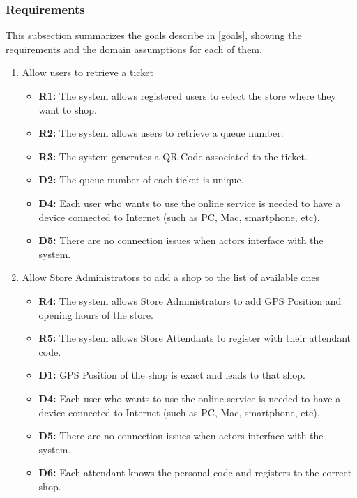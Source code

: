 \documentclass[table, 12pt]{article}
\begin{document}
\newpage

\subsubsection{Requirements}
This subsection summarizes the goals describe in \ref{goals}, showing the requirements and the domain assumptions for each of them.


\begin{enumerate}[label=\textbf{-G\arabic*}:]
    \item {Allow users to retrieve a ticket
          \begin{itemize}
              \item \textbf{R1:} The system allows registered users to select the store where they want to shop.
              \item \textbf{R2:} The system allows users to retrieve a queue number.
              \item \textbf{R3:} The system generates a QR Code associated to the ticket.
              \item \textbf{D2:} The queue number of each ticket is unique.
              \item \textbf{D4:} Each user who wants to use the online service is needed to have a device connected to Internet (such as PC, Mac, smartphone, etc).
              \item \textbf{D5:} There are no connection issues when actors interface with the system.
          \end{itemize}
          }
    \item {Allow Store Administrators to add a shop to the list of available ones
          \begin{itemize}
              \item\textbf{R4:} The system allows Store Administrators to add GPS Position and opening hours of the store.
              \item \textbf{R5:} The system allows Store Attendants to register with their attendant code.
              \item \textbf{D1:} GPS Position of the shop is exact and leads to that shop.
              \item \textbf{D4:} Each user who wants to use the online service is needed to have a device connected to Internet (such as PC, Mac, smartphone, etc).
              \item \textbf{D5:} There are no connection issues when actors interface with the system.
              \item \textbf{D6:} Each attendant knows the personal code and registers to the correct shop.

\end{itemize}}
\end{enumerate}
\end{document}
